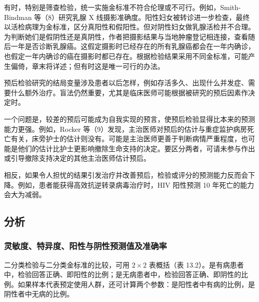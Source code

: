 有时，特别是筛查检验，统一实施金标准不符合伦理或不可行。例如，Smith-Bindman 等（8）研究乳腺 X 线摄影准确度。阳性妇女被转诊进一步检查，最终以活检病理为金标准，区分真阳性和假阳性。但对阴性妇女做乳腺活检并不合理。为判断她们是假阴性还是真阴性，作者把摄影结果与当地肿瘤登记相连接，查看随后一年是否诊断乳腺癌。这假定摄影时已经存在的所有乳腺癌都会在一年内确诊，也假定一年内确诊的癌在摄影时都已存在。根据检验结果采用不同金标准，可能产生偏倚，章末将详述；但有时这是唯一可行的办法。

预后检验研究的结局变量涉及患者以后怎样，例如存活多久、出现什么并发症、需要什么额外治疗。盲法仍然重要，尤其是临床医师可能根据被研究的预后因素作决定时。

一个问题是，较差的预后可能成为自我实现的预言，使预后检验显得比本来的预测能力更强。例如，Rocker 等（9）发现，主治医师对预后的估计与重症监护病房死亡有关，床旁护士的估计则没有。可能是主治医师更善于判断病情严重程度，也可能是他们的估计比护士更影响撤除生命支持的决定。要区分两者，可请未参与作出或引导撤除支持决定的其他主治医师估计预后。

相反，如果令人担忧的结果引发治疗并改善预后，检验或评分的预测能力反而会下降。例如，患者能获得高效抗逆转录病毒治疗时，HIV 阳性预测 10 年死亡的能力会大为减弱。

\subsection{分析}
\subsubsection{灵敏度、特异度、阳性与阴性预测值及准确率}
二分类检验与二分类金标准的比较，可用 $2\times2$ 表概括（表 13.2）。是有病患者中，检验回答正确、即阳性的比例；是无病患者中，检验回答正确、即阴性的比例。如果样本代表预定使用人群，还可计算两个参数：是阳性者中有病的比例，是阴性者中无病的比例。

